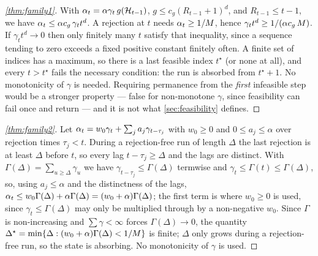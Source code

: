 \begin{proof}[\cref{thm:family1}]
With $\alpha_t = \alpha\gamma_t\,g(\mathcal{H}_{t-1})$, $g \le c_g(R_{t-1}+1)^d$, and
$R_{t-1}\le t-1$, we have $\alpha_t \le \alpha c_g\,\gamma_t t^d$. A rejection at $t$ needs
$\alpha_t \ge 1/M$, hence $\gamma_t t^d \ge 1/(\alpha c_g\,M)$. If $\gamma_t t^d \to 0$ then only
finitely many $t$ satisfy that inequality, since a sequence tending to zero exceeds a fixed positive
constant finitely often. A finite set of indices has a maximum, so there is a last feasible index
$t^\star$ (or none at all), and every $t>t^\star$ fails the necessary condition: the run is absorbed
from $t^\star+1$. No monotonicity of $\gamma$ is needed. Requiring permanence from the \emph{first}
infeasible step would be a stronger property --- false for non-monotone $\gamma$, since feasibility can
fail once and return --- and it is not what \cref{sec:feasibility} defines.
\end{proof}

\begin{proof}[\cref{thm:family2}]
Let $\alpha_t = w_0\gamma_t + \sum_j a_j\gamma_{t-\tau_j}$ with $w_0\ge0$ and $0\le a_j\le\alpha$ over
rejection times $\tau_j<t$. During a rejection-free run of length $\Delta$ the last rejection is at least
$\Delta$ before $t$, so every lag $t-\tau_j\ge\Delta$ and the lags are distinct. With
$\Gamma(\Delta)=\sum_{u\ge\Delta}\gamma_u$ we have $\gamma_{t-\tau_j}\le\Gamma(\Delta)$ termwise and
$\gamma_t\le\Gamma(t)\le\Gamma(\Delta)$, so, using $a_j\le\alpha$ and the distinctness of the lags,
$\alpha_t \le w_0\Gamma(\Delta) + \alpha\Gamma(\Delta) = (w_0+\alpha)\Gamma(\Delta)$; the first term is
where $w_0\ge0$ is used, since $\gamma_t\le\Gamma(\Delta)$ may only be multiplied through by a
non-negative $w_0$. Since $\Gamma$ is
non-increasing and $\sum\gamma<\infty$ forces $\Gamma(\Delta)\to0$, the quantity
$\Delta^\star=\min\{\Delta:(w_0+\alpha)\Gamma(\Delta)<1/M\}$ is finite; $\Delta$ only grows during
a rejection-free run, so the state is absorbing. No monotonicity of $\gamma$ is used.
\end{proof}


